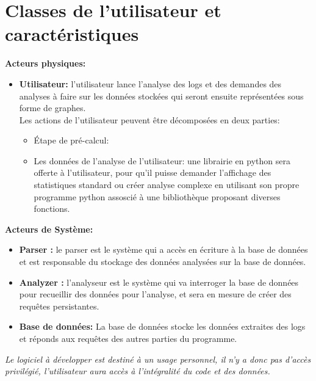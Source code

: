 \documentclass{scrreprt}
\begin{document}
\section{Classes de l'utilisateur et caractéristiques}

\textbf{Acteurs physiques:}\\

\begin{itemize}
 \item \textbf{Utilisateur:} l'utilisateur lance l'analyse des logs et des demandes des analyses à faire sur les données stockées qui seront ensuite représentées sous forme de graphes.\\
   Les actions de l'utilisateur peuvent être décomposées en deux parties:
   \begin{itemize}
   \item Étape de pré-calcul: %
   \item Les données de l'analyse de l'utilisateur: une librairie en python sera offerte à l'utilisateur, pour qu'il puisse demander l'affichage des statistiques standard ou créer analyse complexe en utilisant son propre programme python assoscié à une bibliothèque proposant diverses fonctions. 
   \end{itemize}
\end{itemize}

\textbf{Acteurs de Système:}\\
\begin{itemize}
 \item \textbf{Parser :} le parser est le système qui a accès en écriture à la base de données et est responsable du stockage des données analysées sur la base de données.

 \item \textbf{Analyzer :} l'analyseur est le système qui va interroger la base de données pour recueillir des données pour l'analyse, et sera en mesure de créer des requêtes persistantes.

   \item \textbf{Base de données: } La base de données stocke les données extraites des logs et réponds aux requêtes des autres parties du programme.
\end{itemize}

\textit{Le logiciel à développer est destiné à un usage personnel, il n'y a donc pas d'accès privilégié, l'utilisateur aura accès à l'intégralité du code et des données.}
\end{document}
